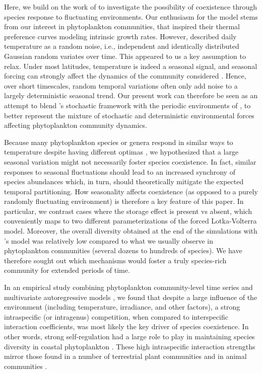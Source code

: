 \documentclass[a4paper,12pt]{article}
\begin{document}
Here, we build on the work of \citet{scranton_coexistence_2016} to
investigate the possibility of coexistence through species response
to fluctuating environments. Our enthusiasm for the \citet{scranton_coexistence_2016}
model stems from our interest in phytoplankton communities, that inspired
their thermal preference curves modeling intrinsic growth rates. However,
\citet{scranton_coexistence_2016} described daily temperature as
a random noise, i.e., independent and identically distributed Gaussian
random variates over time. This appeared to us a key assumption to
relax. Under most latitudes, temperature is indeed a seasonal signal,
and seasonal forcing can strongly affect the dynamics of the community
considered \citep{vesipa_impact_2017}. Hence, over short timescales,
random temporal variations often only add noise to a largely deterministic
seasonal trend. Our present work can therefore be seen as an attempt
to blend \citet{scranton_coexistence_2016}'s stochastic framework
with the periodic environments of \citet{barabas_community_2012},
to better represent the mixture of stochastic and deterministic environmental
forces affecting phytoplankton community dynamics. 

Because many phytoplankton species or genera respond in similar ways
to temperature despite having different optimas \citep{moisan_modelling_2002},
we hypothesized that a large seasonal variation might not necessarily
foster species coexistence. In fact, similar responses to seasonal
fluctuations should lead to an increased synchrony of species abundances
which, in turn, should theoretically mitigate the expected temporal
partitioning. How seasonality affects coexistence (as opposed to a
purely randomly fluctuating environment) is therefore a key feature
of this paper. In particular, we contrast cases where the storage
effect is present vs absent, which conveniently maps to two different
parameterizations of the forced Lotka-Volterra model. Moreover, the
overall diversity obtained at the end of the simulations with \citet{scranton_coexistence_2016}'s
model was relatively low compared to what we usually observe in phytoplankton
communities (several dozens to hundreds of species). We have therefore
sought out which mechanisms would foster a truly species-rich community
for extended periods of time. 

In an empirical study combining phytoplankton community-level time
series and multivariate autoregressive models \citep{barraquand2018coastal},
we found that despite a large influence of the environment (including
temperature, irradiance, and other factors), a strong intraspecific
(or intragenus) competition, when compared to interspecific interaction
coefficients, was most likely the key driver of species coexistence.
In other words, strong self-regulation had a large role to play in
maintaining species diversity in coastal phytoplankton \citep{barraquand2018coastal}.
These high intraspecific interaction strengths mirror those found
in a number of terrestrial plant communities \citep{adler_competition_2018}
and in animal communities \citep{mutshinda_what_2009}.
\end{document}
